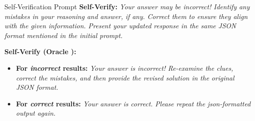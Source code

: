 \begin{AIbox}{Self-Verification Prompt}
    \textbf{Self-Verify:} 
    \textit{Your answer may be incorrect!  Identify any mistakes in your reasoning and answer, if any. Correct them to ensure they align with the given information.  Present your updated response in the same JSON format mentioned in the initial prompt. }  

    \textbf{Self-Verify (Oracle {\scriptsize \faLightbulb}):}
    \begin{itemize}[leftmargin=10pt,itemsep=0pt,parsep=0pt,topsep=0pt,partopsep=0pt]
        \item \textbf{For \textit{incorrect} results:} \textit{Your answer is incorrect! Re-examine the clues, correct the mistakes, and then provide the revised solution in the original JSON format.}
        \item \textbf{For \textit{correct} results:} \textit{Your answer is correct. Please repeat the json-formatted output again.}
    \end{itemize}  
\end{AIbox}





